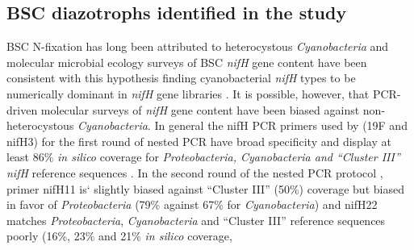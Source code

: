 \subsection{BSC diazotrophs identified in the study} BSC N-fixation has long
been attributed to heterocystous \textit{Cyanobacteria} and molecular microbial
ecology surveys of BSC \textit{nifH} gene content have been consistent with
this hypothesis finding cyanobacterial \textit{nifH} types to be numerically
dominant in \textit{nifH} gene libraries \citep{Yeager,14766579,Yeager_2012}.
It is possible, however, that PCR-driven molecular surveys of \textit{nifH}
gene content have been biased against non-heterocystous \textit{Cyanobacteria}.
In general the nifH PCR primers used by \citet{Yeager,14766579,Yeager_2012} 
(19F and nifH3) for the first
round of nested PCR have broad specificity and display at least 86\% \textit{in
silico} coverage for \textit{Proteobacteria, Cyanobacteria and ``Cluster III''}
\textit{nifH} reference sequences \citep{Gaby_2012}. In the second round of
the nested PCR protocol \citep{Yeager,14766579,Yeager_2012}, primer nifH11 is` slightly biased against
``Cluster III'' (50\%) coverage but biased in favor of \textit{Proteobacteria}
(79\% against 67\% for \textit{Cyanobacteria}) and nifH22 matches
\textit{Proteobacteria}, \textit{Cyanobacteria} and ``Cluster III'' reference
sequences poorly (16\%, 23\% and 21\% \textit{in silico} coverage,
